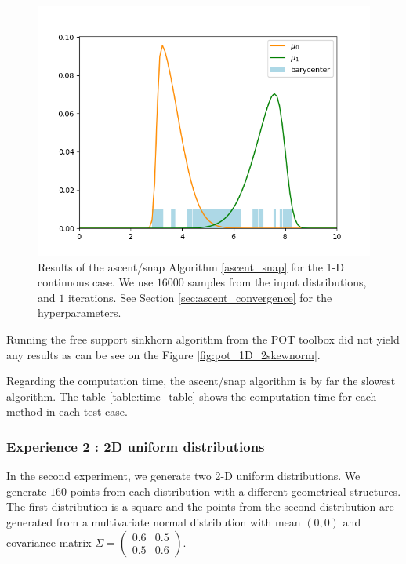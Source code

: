 \begin{figure}
    \centering
    \includegraphics[width=\textwidth]{figures/ascent_snap_1D_2skewnorm.png}
    \caption{Results of the ascent/snap Algorithm \ref{ascent_snap} for the 1-D continuous case. We use $16000$ samples from the input distributions, and $1$ iterations. See Section \ref{sec:ascent_convergence} for the hyperparameters.}
    \label{fig:ascent_snap_1D_2skewnorm}
\end{figure}

Running the free support sinkhorn algorithm from the POT toolbox did not yield any results as can be see on the Figure \ref{fig:pot_1D_2skewnorm}.

Regarding the computation time, the ascent/snap algorithm is by far the slowest algorithm. The table \ref{table:time_table} shows the computation time for each method in each test case.

\subsubsection{Experience 2 : 2D uniform distributions}

In the second experiment, we generate two 2-D uniform distributions. We generate $160$ points from each distribution with a different geometrical structures. The first distribution is a square and the points from the second distribution are generated from a multivariate normal distribution with mean $(0, 0)$ and covariance matrix
$
\Sigma = \left(\begin{array}{cc}
0.6 & 0.5 \\
0.5 & 0.6
\end{array}\right)
$.

